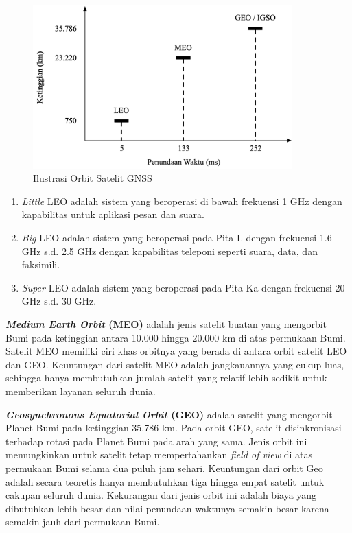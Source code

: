 \begin{figure}[H]
	\centering
	\includegraphics[width=10cm]{contents/chapter-2/alt-comp.png}
	\caption{Ilustrasi Orbit Satelit GNSS}
	\label{Fig: alt-comp}
\end{figure}


\begin{enumerate}
	\item \textit{Little} LEO adalah sistem yang beroperasi di bawah frekuensi 1 GHz dengan kapabilitas untuk aplikasi pesan dan suara.
	\item \textit{Big} LEO adalah sistem yang beroperasi pada Pita L dengan frekuensi 1.6 GHz s.d. 2.5 GHz dengan kapabilitas teleponi seperti suara, data, dan faksimili.
	\item \textit{Super} LEO adalah sistem yang beroperasi pada Pita Ka dengan frekuensi 20 GHz s.d. 30 GHz.
\end{enumerate}

\textbf{\textit{Medium Earth Orbit} (MEO)} adalah jenis satelit buatan yang mengorbit Bumi pada ketinggian antara 10.000 hingga 20.000 km di atas permukaan Bumi. Satelit MEO memiliki ciri khas orbitnya yang berada di antara orbit satelit LEO dan GEO. Keuntungan dari satelit MEO adalah jangkauannya yang cukup luas, sehingga hanya membutuhkan jumlah satelit yang relatif lebih sedikit untuk memberikan layanan seluruh dunia.

\textbf{\textit{Geosynchronous Equatorial Orbit} (GEO)} adalah satelit yang mengorbit Planet Bumi pada ketinggian 35.786 km. Pada orbit GEO, satelit disinkronisasi terhadap rotasi pada Planet Bumi pada arah yang sama. Jenis orbit ini memungkinkan untuk satelit tetap mempertahankan \textit{field of view} di atas permukaan Bumi selama dua puluh jam sehari. Keuntungan dari orbit Geo adalah secara teoretis hanya membutuhkan tiga hingga empat satelit untuk cakupan seluruh dunia. Kekurangan dari jenis orbit ini adalah biaya yang dibutuhkan lebih besar dan nilai penundaan waktunya semakin besar karena semakin jauh dari permukaan Bumi.

